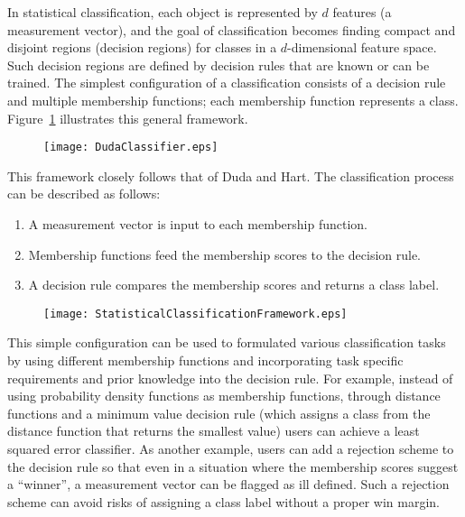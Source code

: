 In statistical classification, each object is represented by $d$
features (a measurement vector), and the goal of classification
becomes finding compact and disjoint regions (decision
regions\cite{Duda2000}) for classes in a $d$-dimensional feature
space. Such decision regions are defined by
decision rules that are known or can be trained.  The simplest
configuration of a classification consists of a decision rule and
multiple membership functions; each membership function represents a
class. Figure~\ref{fig:simple} illustrates this general framework.

\begin{figure}[h]
  \centering
  \texttt{[image: DudaClassifier.eps]}
  \label{fig:simple}
\end{figure}

This framework closely follows that of Duda and
Hart\cite{Duda2000}. The classification process can be described
as follows:

\begin{enumerate}
\item{A measurement vector is input to each membership function.}
\item{Membership functions feed the membership scores to the
    decision rule.}
\item{A decision rule compares the membership scores and returns a
    class label.}
\end{enumerate}

\begin{figure}
  \centering
  \texttt{[image: StatisticalClassificationFramework.eps]}
  \protect\label{fig:StatisticalClassificationFramework}
\end{figure}

This simple configuration can be used to formulated various classification
tasks by using different membership functions and incorporating task specific
requirements and prior knowledge into the decision rule. For example, instead
of using probability density functions as membership functions, through
distance functions and a minimum value decision rule (which assigns a class
from the distance function that returns the smallest value) users can achieve a
least squared error classifier. As another example, users can add a rejection
scheme to the decision rule so that even in a situation where the membership
scores suggest a ``winner'', a measurement vector can be flagged as ill
defined. Such a rejection scheme can avoid risks of assigning a class label
without a proper win margin.

